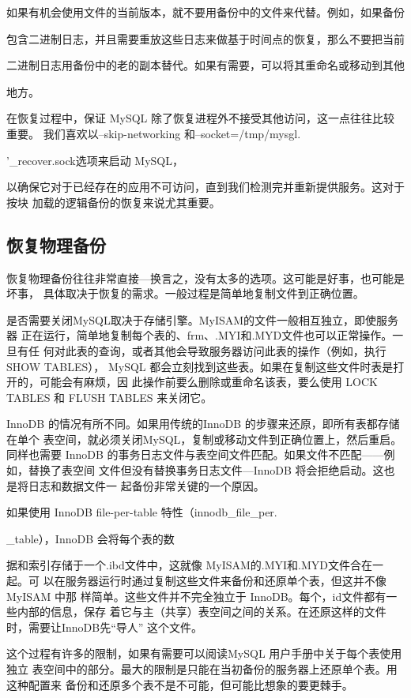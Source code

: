 如果有机会使用文件的当前版本，就不要用备份中的文件来代替。例如，如果备份

包含二进制日志，并且需要重放这些日志来做基于时间点的恢复，那么不要把当前

二进制日志用备份中的老的副本替代。如果有需要，可以将其重命名或移动到其他

地方。

在恢复过程中，保证 MySQL 除了恢复进程外不接受其他访问，这一点往往比较重要。
我们喜欢以--skip-networking 和--socket=/tmp/mysgl.

'\_recover.sock选项来启动 MySQL，

以确保它对于已经存在的应用不可访问，直到我们检测完并重新提供服务。这对于按块
加载的逻辑备份的恢复来说尤其重要。

\subsection{恢复物理备份}
恢复物理备份往往非常直接—换言之，没有太多的选项。这可能是好事，也可能是坏事，
具体取决于恢复的需求。一般过程是简单地复制文件到正确位置。

是否需要关闭MySQL取决于存储引擎。MyISAM的文件一般相互独立，即使服务器
正在运行，简单地复制每个表的、frm、.MYI和.MYD文件也可以正常操作。一旦有任
何对此表的查询，或者其他会导致服务器访问此表的操作（例如，执行 SHOW TABLES），
MySQL 都会立刻找到这些表。如果在复制这些文件时表是打开的，可能会有麻烦，因
此操作前要么删除或重命名该表，要么使用 LOCK TABLES 和 FLUSH TABLES 来关闭它。

InnoDB 的情况有所不同。如果用传统的InnoDB 的步骤来还原，即所有表都存储在单个
表空间，就必须关闭MySQL，复制或移动文件到正确位置上，然后重启。同样也需要
InnoDB 的事务日志文件与表空间文件匹配。如果文件不匹配——例如，替换了表空间
文件但没有替换事务日志文件—InnoDB 将会拒绝启动。这也是将日志和数据文件一
起备份非常关键的一个原因。

如果使用 InnoDB file-per-table 特性（innodb\_file\_per.

\_table），InnoDB 会将每个表的数

据和索引存储于一个.ibd文件中，这就像 MyISAM的.MYI和.MYD文件合在一起。可
以在服务器运行时通过复制这些文件来备份和还原单个表，但这并不像 MyISAM 中那
样简单。这些文件并不完全独立于 InnoDB。每个，id文件都有一些内部的信息，保存
着它与主（共享）表空间之间的关系。在还原这样的文件时，需要让InnoDB先“导人”
这个文件。

这个过程有许多的限制，如果有需要可以阅读MySQL 用户手册中关于每个表使用独立
表空间中的部分。最大的限制是只能在当初备份的服务器上还原单个表。用这种配置来
备份和还原多个表不是不可能，但可能比想象的要更棘手。

